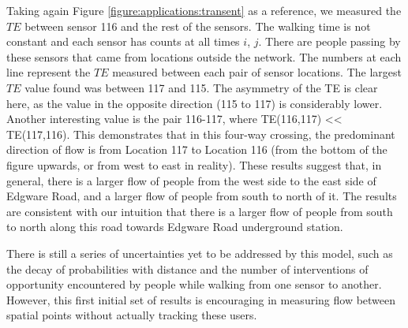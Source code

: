 Taking again Figure \ref{figure:applications:transent} as a reference, we measured the $TE$ between sensor 116 and the rest of the sensors.
The walking time is not constant and each sensor has counts at all times $i$, $j$.
There are people passing by these sensors that came from locations outside the network.
The numbers at each line represent the $TE$ measured between each pair of sensor locations.
The largest $TE$ value found was between 117 and 115.
The asymmetry of the TE is clear here, as the value in the opposite direction (115 to 117) is considerably lower.
Another interesting value is the pair 116-117, where TE(116,117) << TE(117,116).
This demonstrates that in this four-way crossing, the predominant direction of flow is from Location 117 to Location 116 (from the bottom of the figure upwards, or from west to east in reality). These results suggest that, in general, there is a larger flow of people from the west side to the east side of Edgware Road, and a larger flow of people from south to north of it. The results are consistent with our intuition that there is a larger flow of people from south to north along this road towards Edgware Road underground station.

There is still a series of uncertainties yet to be addressed by this model, such as the decay of probabilities with distance and the number of interventions of opportunity encountered by people while walking from one sensor to another.
However, this first initial set of results is encouraging in measuring flow between spatial points without actually tracking these users.
